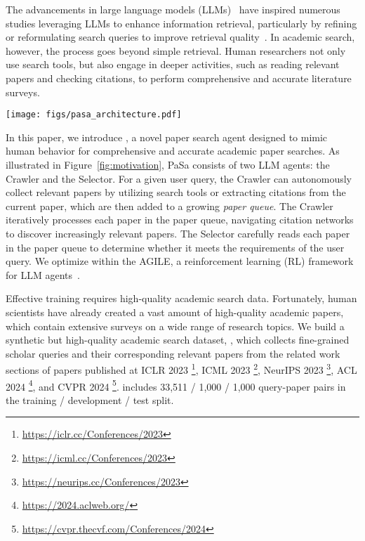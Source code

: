 The advancements in large language models (LLMs)~\cite{openai2023gpt4,anthropic2024claude,team2023gemini,yang2024qwen2} have inspired numerous studies leveraging LLMs to enhance information retrieval, particularly by refining or reformulating search queries to improve retrieval quality~\cite{alaofi2023can,li2023generate,ma2023query,peng2024large}. In academic search, however, the process goes beyond simple retrieval. Human researchers not only use search tools, but also engage in deeper activities, such as reading relevant papers and checking citations, to perform comprehensive and accurate literature surveys.

\begin{figure*}[!t] 
\centering 
\texttt{[image: figs/pasa\_architecture.pdf]} 
\caption{Architecture of \pasa. The system consists of two LLM agents, Crawler and Selector. The Crawler processes the user query and can access papers from the paper queue. It can autonomously invoke the search tool, expand citations, or stop processing of the current paper. All papers collected by the Crawler are appended to the paper queue. The Selector reads each paper in the paper queue to determine whether it meets the criteria specified in the user query.} 
\label{fig:motivation} 
\vspace{-10pt}
\end{figure*}

In this paper, we introduce \pasa, a novel paper search agent designed to mimic human behavior for comprehensive and accurate academic paper searches. As illustrated in Figure~\ref{fig:motivation}, PaSa consists of two LLM agents: the Crawler and the Selector. For a given user query, the Crawler can autonomously collect relevant papers by utilizing search tools or extracting citations from the current paper, which are then added to a growing \emph{paper queue}. The Crawler iteratively processes each paper in the paper queue, navigating citation networks to discover increasingly relevant papers. The Selector carefully reads each paper in the paper queue to determine whether it meets the requirements of the user query. We optimize \pasa within the AGILE, a reinforcement learning (RL) framework for LLM agents~\cite{feng2024agile}.

Effective training requires high-quality academic search data. Fortunately, human scientists have already created a vast amount of high-quality academic papers, which contain extensive surveys on a wide range of research topics. We build a synthetic but high-quality academic search dataset, \autoS, which collects fine-grained scholar queries and their corresponding relevant papers from the related work sections of papers published at ICLR 2023 \footnote{\url{https://iclr.cc/Conferences/2023}}, ICML 2023 \footnote{\url{https://icml.cc/Conferences/2023}}, NeurIPS 2023 \footnote{\url{https://neurips.cc/Conferences/2023}}, ACL 2024 \footnote{\url{https://2024.aclweb.org/}}, and CVPR 2024 \footnote{\url{https://cvpr.thecvf.com/Conferences/2024}}. \autoS includes 33,511 / 1,000 / 1,000 query-paper pairs in the training / development / test split. 

